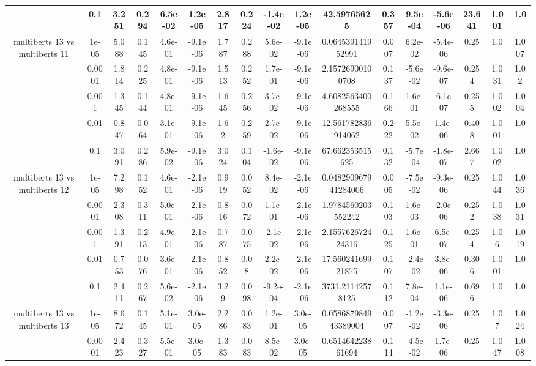 \begin{tabular}{|c|c|c|c|c|c|c|c|c|c|c|c|c|c|c|c|c|}
 & 0.1 & 3.251 & 0.294 & 6.5e-02 & 1.2e-05 & 2.817 & 0.224 & -1.4e-02 & 1.2e-05 & 42.59765625 & 0.357 & 9.5e-04 & -5.6e-06 & 23.641 & 1.001 & 1.0 \\
\hline
\multirow{5}{*}{multiberts 13 vs multiberts 11} & 1e-05 & 5.088 & 0.145 & 4.6e-01 & -9.1e-06 & 1.787 & 0.288 & 5.6e-02 & -9.1e-06 & 0.064539141952991 & 0.007 & 6.2e-02 & -5.4e-06 & 0.25 & 1.0 & 1.007 \\
 & 0.0001 & 1.814 & 0.225 & 4.8e-01 & -9.1e-06 & 1.513 & 0.252 & 1.7e-01 & -9.1e-06 & 2.15726900100708 & 0.137 & -5.6e-02 & -9.6e-07 & 0.254 & 1.031 & 1.02 \\
 & 0.001 & 1.345 & 0.144 & 4.8e-01 & -9.1e-06 & 1.645 & 0.256 & 3.7e-02 & -9.1e-06 & 4.6082563400268555 & 0.166 & 1.6e-01 & -6.1e-07 & 0.255 & 1.002 & 1.004 \\
 & 0.01 & 0.847 & 0.064 & 3.1e-01 & -9.1e-06 & 1.62 & 0.259 & 2.7e-02 & -9.1e-06 & 12.561782836914062 & 0.222 & 5.5e-02 & 1.4e-06 & 0.408 & 1.001 & 1.0 \\
 & 0.1 & 3.091 & 0.286 & 5.9e-02 & -9.1e-06 & 3.024 & 0.104 & -1.6e-02 & -9.1e-06 & 67.662353515625 & 0.132 & -5.7e-04 & -1.8e-07 & 2.667 & 1.002 & 1.0 \\
\hline
\multirow{5}{*}{multiberts 13 vs multiberts 12} & 1e-05 & 7.298 & 0.152 & 4.6e-01 & -2.1e-06 & 0.919 & 0.052 & 8.4e-02 & -2.1e-06 & 0.048290967941284006 & 0.005 & -7.5e-02 & -9.3e-06 & 0.25 & 1.044 & 1.036 \\
 & 0.0001 & 2.308 & 0.311 & 5.0e-01 & -2.1e-06 & 0.816 & 0.072 & 1.1e-01 & -2.1e-06 & 1.9784560203552242 & 0.103 & 1.6e-03 & -2.0e-06 & 0.252 & 1.038 & 1.031 \\
 & 0.001 & 1.391 & 0.213 & 4.9e-01 & -2.1e-06 & 0.787 & 0.075 & -2.1e-02 & -2.1e-06 & 2.155762672424316 & 0.125 & 1.6e-01 & 6.5e-07 & 0.254 & 1.06 & 1.019 \\
 & 0.01 & 0.753 & 0.076 & 3.6e-01 & -2.1e-06 & 0.852 & 0.08 & 2.2e-02 & -2.1e-06 & 17.56024169921875 & 0.107 & -2.4e-02 & 3.8e-06 & 0.306 & 1.001 & 1.0 \\
 & 0.1 & 2.411 & 0.267 & 5.6e-02 & -2.1e-06 & 3.29 & 0.098 & -9.2e-04 & -2.1e-06 & 3731.21142578125 & 0.112 & 7.8e-04 & 1.1e-06 & 0.696 & 1.0 & 1.0 \\
\hline
\multirow{5}{*}{multiberts 13 vs multiberts 13} & 1e-05 & 8.672 & 0.145 & 5.1e-01 & 3.0e-05 & 2.286 & 0.083 & 1.2e-01 & 3.0e-05 & 0.058687984943389004 & 0.007 & -1.2e-02 & -3.3e-06 & 0.25 & 1.07 & 1.024 \\
 & 0.0001 & 2.423 & 0.327 & 5.5e-01 & 3.0e-05 & 1.383 & 0.083 & 8.5e-02 & 3.0e-05 & 0.651464223861694 & 0.114 & -4.5e-02 & 1.7e-06 & 0.25 & 1.047 & 1.008 \\

\end{tabular}
